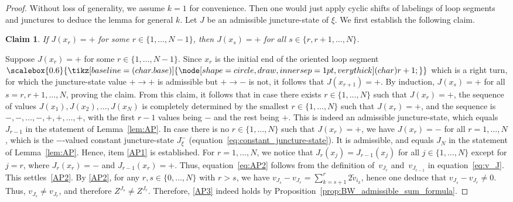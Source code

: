 \documentclass[pdftex]{sigma}
\numberwithin{equation}{section}
\newtheorem*{Claim*}{Claim}
\theoremstyle{definition}
\newcommand*\circlee[1]{\scalebox{0.6}{\tikz[baseline=(char.base)]{
 \node[shape=circle,draw,inner sep=1pt,very thick] (char) {#1};}}}
\newcommand{\til}[1]{\widetilde{#1}}
\begin{document}
\begin{proof} Without loss of generality, we assume $k=1$ for convenience. Then one would just apply cyclic shifts of labelings of loop segments and junctures to deduce the lemma for general $k$.
Let $J$ be an admissible juncture-state of $\xi$. We first establish the following claim.
\begin{Claim*} If $J(x_r)=+$ for some $r \in \{1,\dots,N-1\}$, then $J(x_s)=+$ for all $s \in \{r,r+1,\dots,N\}$.
\end{Claim*}
Suppose $J(x_r)=+$ for some $r \in \{1,\dots,N-1\}$. Since $x_r$ is the initial end of the oriented loop segment $\circlee{r+1}$ which is a right turn, for which the juncture-state value $+ \to +$ is admissible but $+ \to -$ is not, it follows that $J(x_{r+1})=+$. By induction, $J(x_s)=+$ for all $s = r,r+1,\dots,N$, proving the claim.
From this claim, it follows that in case there exists $r\in \{1,\dots,N\}$ such that $J(x_r)=+$, the sequence of values $J(x_1), J(x_2),\dots,J(x_N)$ is completely determined by the smallest $r \in \{1,\dots,N\}$ such that $J(x_r)=+$, and the sequence is $-,-,\dots,-,+,+,\dots,+$, with the first $r-1$ values being $-$ and the rest being $+$. This is indeed an admissible juncture-state, which equals $J_{r-1}$ in the statement of Lemma~\ref{lem:AP}.
In case there is no $r\in \{1,\dots,N\}$ such that $J(x_r)=+$, we have $J(x_r)=-$ for all $r=1,\dots,N$, which is the $-$-valued constant juncture-state $J_\xi^-$ (equation~\eqref{eq:constant_juncture-state}). It is admissible, and equals $J_N$ in the statement of Lemma~\ref{lem:AP}. Hence, item \ref{AP1} is established.
For $r=1,\dots,N$, we notice that $J_r(x_j) = J_{r-1}(x_j)$ for all $j\in\{1,\dots,N\}$ except for $j=r$, where $J_r(x_r)=-$ and $J_{r-1}(x_r)=+$. Thus, equation~\eqref{eq:AP2} follows from the definition of~$v_{J_r}$ and~$v_{J_{r-1}}$ in equation~\eqref{eq:v_J}. This settles~\ref{AP2}.
By \ref{AP2}, for any $r,s\in \{0,\dots,N\}$ with $r>s$, we have $v_{J_s} - v_{J_r} = \sum_{k=s+1}^r 2 \til{v}_{i_k}$, hence one deduce that $v_{J_s} - v_{J_r} \neq 0$. Thus, $v_{J_s} \neq v_{J_r}$, and therefore $Z^{J_s} \neq Z^{J_r}$. Therefore, \ref{AP3} indeed holds by Proposition~\ref{prop:BW_admissible_sum_formula}.
\end{proof}
\end{document}

